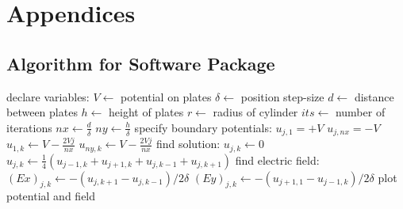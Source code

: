 \documentclass[11pt, a4paper]{article}
\begin{document}


\appendix
\section{Appendices}
\subsection{Algorithm for Software Package}

\begin{algorithm}
\begin{algorithmic}[1]
\State declare variables:
\State $V \gets$ potential on plates
\State $\delta \gets$ position step-size
\State $d \gets$ distance between plates
\State $h \gets$ height of plates
\State $r \gets$ radius of cylinder
\State $its \gets$ number of iterations
\State $nx \gets \frac{d}{\delta}$ 
\State $ny \gets \frac{h}{\delta}$ 
\State specify boundary potentials:
   \State $u_{j, 1} = +V$
   \State $u_{j, nx} = -V$
\EndFor
{}
   \State $u_{1, k} \gets V-\frac{2Vj}{nx}$
   \State $u_{ny, k} \gets V-\frac{2Vj}{nx}$
\EndFor
\State find solution:
            \State $u_{j, k} \gets 0$
         \Else
            \State $u_{j,k} \gets \frac{1}{4}(u_{j-1,k}+u_{j+1,k}+u_{j,k-1}+u_{j,k+1})$
         \EndIf
      \EndFor
   \EndFor
\EndFor
\State find electric field:
      \State $(Ex)_{j, k} \gets -\left(u_{j,k+1}-u_{j,k-1}\right)/2\delta$
      \State $(Ey)_{j,k} \gets -\left(u_{j+1,1}-u_{j-1,k}\right)/2\delta$
   \EndFor
\EndFor
\State plot potential and field
\EndProcedure
\end{algorithmic}
\end{algorithm}
\end{document}
